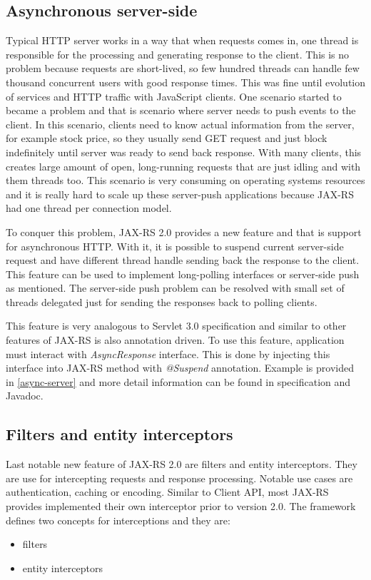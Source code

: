 \documentclass[12pt,final,oneside]{fithesis2}
\begin{document}
\subsection*{Asynchronous server-side}
Typical HTTP server works in a way that when requests comes in, one thread is responsible for the processing and generating response to the client. This is no problem because requests are short-lived, so few hundred threads can handle few thousand concurrent users with good response times. This was fine until evolution of services and HTTP traffic with JavaScript clients. One scenario started to became a problem and that is scenario where server needs to push events to the client. In this scenario, clients need to know actual information from the server, for example stock price, so they usually send GET request and just block indefinitely until server was ready to send back response. With many clients, this creates large amount of open, long-running requests that are just idling and with them threads too. This scenario is very consuming on operating systems resources and it is really hard to scale up these server-push applications because JAX-RS had one thread per connection model.\cite{resteasy-book}

To conquer this problem, JAX-RS 2.0 provides a new feature and that is support for asynchronous HTTP. With it, it is possible to suspend current server-side request and have different thread handle sending back the response to the client. This feature can be used to implement long-polling interfaces or server-side push as mentioned. The server-side push problem can be resolved with small set of threads delegated just for sending the responses back to polling clients.

This feature is very analogous to Servlet 3.0 specification and similar to other features of JAX-RS is also annotation driven. To use this feature, application must interact with \textit{AsyncResponse} interface. This is done by injecting this interface into JAX-RS method with \textit{@Suspend} annotation.\cite{resteasy-book}\cite{jax-rs-2.0} Example is provided in \ref{async-server} and more detail information can be found in specification and Javadoc.

\subsection*{Filters and entity interceptors}
Last notable new feature of JAX-RS 2.0 are filters and entity interceptors. They are use for intercepting requests and response processing. Notable use cases are authentication, caching or encoding. Similar to Client API, most JAX-RS provides implemented their own interceptor prior to version 2.0. The framework defines two concepts for interceptions and they are:
\begin{itemize}
\item 
filters

\item
entity interceptors
\end{itemize}
\end{document}
